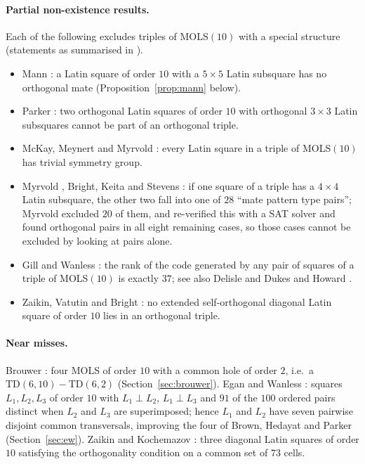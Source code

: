 \documentclass[11pt]{article}
\theoremstyle{remark}
\newcommand{\TD}{\mathrm{TD}}
\begin{document}
\paragraph{Partial non-existence results.}  Each of the following excludes triples
of MOLS$(10)$ with a special structure (statements as summarised in \cite{BKS26}).
\begin{itemize}
\item Mann \cite{Man44}: a Latin square of order $10$ with a $5\times 5$ Latin subsquare
  has no orthogonal mate (Proposition~\ref{prop:mann} below).
\item Parker \cite{Par62}: two orthogonal Latin squares of order $10$ with orthogonal
  $3\times 3$ Latin subsquares cannot be part of an orthogonal triple.
\item McKay, Meynert and Myrvold \cite{MMM07}: every Latin square in a triple of
  MOLS$(10)$ has trivial symmetry group.
\item Myrvold \cite{Myr99}, Bright, Keita and Stevens \cite{BKS26}: if one square of a
  triple has a $4\times 4$ Latin subsquare, the other two fall into one of $28$
  ``mate pattern type pairs''; Myrvold excluded $20$ of them, and \cite{BKS26}
  re-verified this with a SAT solver and found orthogonal pairs in all eight remaining
  cases, so those cases cannot be excluded by looking at pairs alone.
\item Gill and Wanless \cite{GW23}: the rank of the code generated by any pair of squares
  of a triple of MOLS$(10)$ is exactly $37$; see also Delisle \cite{Del10} and Dukes and
  Howard \cite{DH14}.
\item Zaikin, Vatutin and Bright \cite{ZVB25}: no extended self-orthogonal diagonal Latin
  square of order $10$ lies in an orthogonal triple.
\end{itemize}

\paragraph{Near misses.}  Brouwer \cite{Bro84}: four MOLS of order $10$ with a common
hole of order $2$, i.e.\ a $\TD(6,10)-\TD(6,2)$ (Section~\ref{sec:brouwer}).
Egan and Wanless \cite{EW16}: squares $L_1,L_2,L_3$ of order $10$ with
$L_1\perp L_2$, $L_1\perp L_3$ and $91$ of the $100$ ordered pairs distinct when
$L_2$ and $L_3$ are superimposed; hence $L_1$ and $L_2$ have seven pairwise disjoint common transversals, improving
the four of Brown, Hedayat and Parker \cite{BHP93} (Section~\ref{sec:ew}).  Zaikin and Kochemazov \cite{ZK15}: three
diagonal Latin squares of order $10$ satisfying the orthogonality condition on a common
set of $73$ cells.
\end{document}
